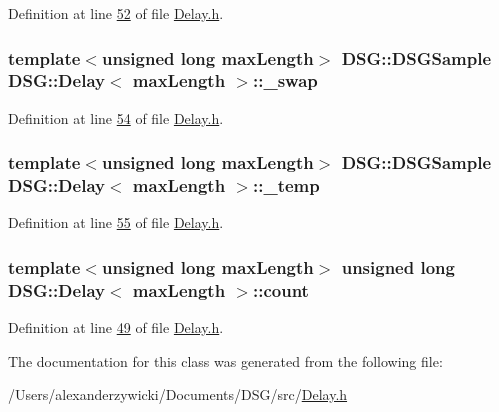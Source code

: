Definition at line \hyperlink{_delay_8h_source_l00052}{52} of file \hyperlink{_delay_8h_source}{Delay.\+h}.

\hypertarget{class_d_s_g_1_1_delay_af026ee90120c5cea6a935aef6cab6624}{
\subsubsection[{\+\_\+swap}]{\setlength{\rightskip}{0pt plus 5cm}template$<$unsigned long max\+Length$>$ {\bf D\+S\+G\+::\+D\+S\+G\+Sample} {\bf D\+S\+G\+::\+Delay}$<$ max\+Length $>$\+::\+\_\+swap\hspace{0.3cm}{\ttfamily [protected]}}}\label{class_d_s_g_1_1_delay_af026ee90120c5cea6a935aef6cab6624}


Definition at line \hyperlink{_delay_8h_source_l00054}{54} of file \hyperlink{_delay_8h_source}{Delay.\+h}.

\hypertarget{class_d_s_g_1_1_delay_a039bb7a3a39aff5841b9e808cacc1a6e}{
\subsubsection[{\+\_\+temp}]{\setlength{\rightskip}{0pt plus 5cm}template$<$unsigned long max\+Length$>$ {\bf D\+S\+G\+::\+D\+S\+G\+Sample} {\bf D\+S\+G\+::\+Delay}$<$ max\+Length $>$\+::\+\_\+temp\hspace{0.3cm}{\ttfamily [protected]}}}\label{class_d_s_g_1_1_delay_a039bb7a3a39aff5841b9e808cacc1a6e}


Definition at line \hyperlink{_delay_8h_source_l00055}{55} of file \hyperlink{_delay_8h_source}{Delay.\+h}.

\hypertarget{class_d_s_g_1_1_delay_a1d54836950db9724434880d859d1e3ea}{
\subsubsection[{count}]{\setlength{\rightskip}{0pt plus 5cm}template$<$unsigned long max\+Length$>$ unsigned long {\bf D\+S\+G\+::\+Delay}$<$ max\+Length $>$\+::count\hspace{0.3cm}{\ttfamily [protected]}}}\label{class_d_s_g_1_1_delay_a1d54836950db9724434880d859d1e3ea}


Definition at line \hyperlink{_delay_8h_source_l00049}{49} of file \hyperlink{_delay_8h_source}{Delay.\+h}.



The documentation for this class was generated from the following file\+:\begin{DoxyCompactItemize}
\item 
/\+Users/alexanderzywicki/\+Documents/\+D\+S\+G/src/\hyperlink{_delay_8h}{Delay.\+h}\end{DoxyCompactItemize}
